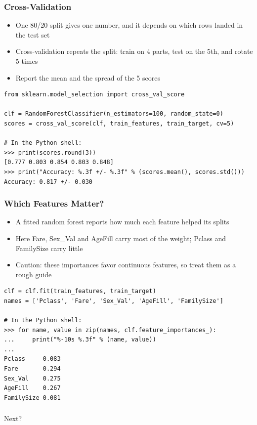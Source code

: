 \begin{frame}[fragile]\frametitle{Cross-Validation}
\begin{itemize}
\item One 80/20 split gives one number, and it depends on which rows landed in the test set
\item Cross-validation repeats the split: train on 4 parts, test on the 5th, and rotate 5 times
\item Report the mean and the spread of the 5 scores
\end{itemize}
\begin{lstlisting}
from sklearn.model_selection import cross_val_score

clf = RandomForestClassifier(n_estimators=100, random_state=0)
scores = cross_val_score(clf, train_features, train_target, cv=5)

# In the Python shell:
>>> print(scores.round(3))
[0.777 0.803 0.854 0.803 0.848]
>>> print("Accuracy: %.3f +/- %.3f" % (scores.mean(), scores.std()))
Accuracy: 0.817 +/- 0.030
\end{lstlisting}
\end{frame}

\begin{frame}[fragile]\frametitle{Which Features Matter?}
\begin{itemize}
\item A fitted random forest reports how much each feature helped its splits
\item Here Fare, Sex\_Val and AgeFill carry most of the weight; Pclass and FamilySize carry little
\item Caution: these importances favor continuous features, so treat them as a rough guide
\end{itemize}
\begin{lstlisting}
clf = clf.fit(train_features, train_target)
names = ['Pclass', 'Fare', 'Sex_Val', 'AgeFill', 'FamilySize']

# In the Python shell:
>>> for name, value in zip(names, clf.feature_importances_):
...     print("%-10s %.3f" % (name, value))
...
Pclass     0.083
Fare       0.294
Sex_Val    0.275
AgeFill    0.267
FamilySize 0.081
\end{lstlisting}
\end{frame}

\begin{frame}[fragile]\frametitle{}
\begin{center}
{\Large Next?}
\end{center}
\end{frame}

